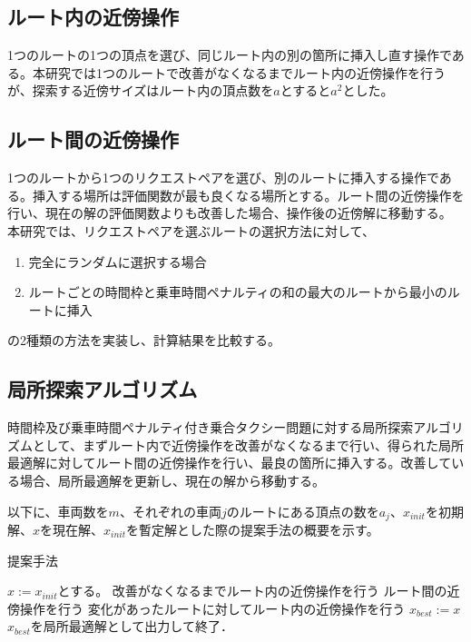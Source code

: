 \subsection{ルート内の近傍操作}
1つのルートの1つの頂点を選び、同じルート内の別の箇所に挿入し直す操作である。本研究では1つのルートで改善がなくなるまでルート内の近傍操作を行うが、探索する近傍サイズはルート内の頂点数を$a$とすると$a^2$とした。

\subsection{ルート間の近傍操作}
1つのルートから1つのリクエストペアを選び、別のルートに挿入する操作である。挿入する場所は評価関数が最も良くなる場所とする。ルート間の近傍操作を行い、現在の解の評価関数よりも改善した場合、操作後の近傍解に移動する。
本研究では、リクエストペアを選ぶルートの選択方法に対して、
\begin{enumerate}
 \item 完全にランダムに選択する場合
 \item ルートごとの時間枠と乗車時間ペナルティの和の最大のルートから最小のルートに挿入
\end{enumerate}
の2種類の方法を実装し、計算結果を比較する。
\subsection{局所探索アルゴリズム}
時間枠及び乗車時間ペナルティ付き乗合タクシー問題に対する局所探索アルゴリズムとして、まずルート内で近傍操作を改善がなくなるまで行い、得られた局所最適解に対してルート間の近傍操作を行い、最良の箇所に挿入する。改善している場合、局所最適解を更新し、現在の解から移動する。

以下に、車両数を$m$、それぞれの車両$j$のルートにある頂点の数を$a_j$、$x_{init}$を初期解、$x$を現在解、$x_{init}$を暫定解とした際の提案手法の概要を示す。
\begin{algorithm}
 \caption{提案手法}
 \label{algo1}
 \begin{algorithmic}[1]%
  \STATE $x := x_{init}$とする。
  \STATE 改善がなくなるまでルート内の近傍操作を行う
  \STATE ルート間の近傍操作を行う
  \STATE 変化があったルートに対してルート内の近傍操作を行う
  \STATE  $x_{best} := x$
  \ENDIF
  \STATE $x_{best}$を局所最適解として出力して終了．
 \end{algorithmic}
\end{algorithm}
